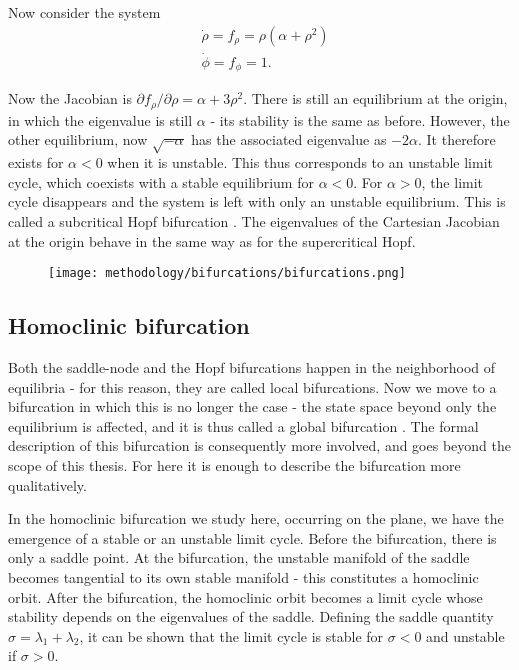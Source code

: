 Now consider the system
%
\begin{align}
    &\dot{\rho} = f_\rho = \rho(\alpha + \rho^2) \\ 
    &\dot{\phi} = f_\phi = 1.
\end{align}

Now the Jacobian is $\partial f_\rho / \partial \rho = \alpha + 3\rho^2$. There is still an equilibrium at the origin, in which the eigenvalue is still $\alpha$ - its stability is the same as before. However, the other equilibrium, now $\sqrt{-\alpha}$ has the associated eigenvalue as $-2\alpha$. It therefore exists for $\alpha < 0$ when it is unstable. This thus corresponds to an unstable limit cycle, which coexists with a stable equilibrium for $\alpha < 0$. For $\alpha > 0$, the limit cycle disappears and the system is left with only an unstable equilibrium. This is called a subcritical Hopf bifurcation \cite{kuznetsov}. The eigenvalues of the Cartesian Jacobian at the origin behave in the same way as for the supercritical Hopf.
%
\begin{figure}
    \centering 
    \texttt{[image: methodology/bifurcations/bifurcations.png]}
    \label{fig:method:bifurcations}
\end{figure}



\subsection{Homoclinic bifurcation}
Both the saddle-node and the Hopf bifurcations happen in the neighborhood of equilibria - for this reason, they are called local bifurcations. Now we move to a bifurcation in which this is no longer the case - the state space beyond only the equilibrium is affected, and it is thus called a global bifurcation \cite{kuznetsov}. The formal description of this bifurcation is consequently more involved, and goes beyond the scope of this thesis. For here it is enough to describe the bifurcation more qualitatively. 

In the homoclinic bifurcation we study here, occurring on the plane, we have the emergence of a stable or an unstable limit cycle. Before the bifurcation, there is only a saddle point. At the bifurcation, the unstable manifold of the saddle becomes tangential to its own stable manifold - this constitutes a homoclinic orbit. After the bifurcation, the homoclinic orbit becomes a limit cycle whose stability depends on the eigenvalues of the saddle. Defining the saddle quantity $\sigma = \lambda_1 + \lambda_2$, it can be shown \cite{kuznetsov} that the limit cycle is stable for $\sigma < 0$ and unstable if $\sigma > 0$. 

